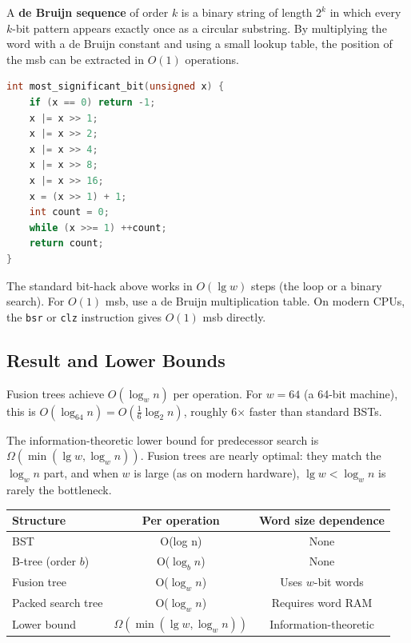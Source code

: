 A \textbf{de Bruijn sequence} of order $k$ is a binary string of length $2^k$ in which every $k$-bit pattern appears exactly once as a circular substring. By multiplying the word with a de Bruijn constant and using a small lookup table, the position of the msb can be extracted in $O(1)$ operations.

\begin{lstlisting}[language=C++]
int most_significant_bit(unsigned x) {
    if (x == 0) return -1;
    x |= x >> 1;
    x |= x >> 2;
    x |= x >> 4;
    x |= x >> 8;
    x |= x >> 16;
    x = (x >> 1) + 1;
    int count = 0;
    while (x >>= 1) ++count;
    return count;
}
\end{lstlisting}

The standard bit-hack above works in $O(\lg w)$ steps (the loop or a binary search). For $O(1)$ msb, use a de Bruijn multiplication table. On modern CPUs, the \texttt{bsr} or \texttt{clz} instruction gives $O(1)$ msb directly.

\subsection{Result and Lower Bounds}

Fusion trees achieve $O(\log_w n)$ per operation. For $w = 64$ (a 64-bit machine), this is $O(\log_{64} n) = O(\frac{1}{6} \log_2 n)$, roughly 6$\times$ faster than standard BSTs.

The information-theoretic lower bound for predecessor search is $\Omega(\min(\lg w, \log_w n))$. Fusion trees are nearly optimal: they match the $\log_w n$ part, and when $w$ is large (as on modern hardware), $\lg w < \log_w n$ is rarely the bottleneck.

\begin{center}
\begin{tabular}{lcc}
\toprule
Structure & Per operation & Word size dependence \\
\midrule
BST & O(log n) & None \\
B-tree (order $b$) & O($\log_b n$) & None \\
Fusion tree & O($\log_w n$) & Uses $w$-bit words \\
Packed search tree & O($\log_w n$) & Requires word RAM \\
Lower bound & $\Omega(\min(\lg w, \log_w n))$ & Information-theoretic \\
\bottomrule
\end{tabular}
\end{center}

